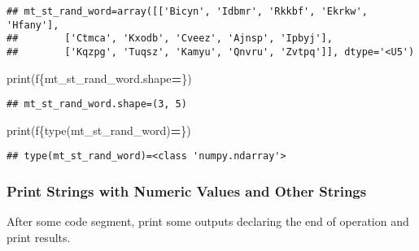\documentclass[
]{book}
\newenvironment{Shaded}{\begin{snugshade}}{\end{snugshade}}
\newcommand{\BuiltInTok}[1]{#1}
\newcommand{\NormalTok}[1]{#1}
\newcommand{\OperatorTok}[1]{\textcolor[rgb]{0.81,0.36,0.00}{\textbf{#1}}}
\newcommand{\SpecialCharTok}[1]{\textcolor[rgb]{0.00,0.00,0.00}{#1}}
\newcommand{\SpecialStringTok}[1]{\textcolor[rgb]{0.31,0.60,0.02}{#1}}
\begin{document}
\begin{verbatim}
## mt_st_rand_word=array([['Bicyn', 'Idbmr', 'Rkkbf', 'Ekrkw', 'Hfany'],
##        ['Ctmca', 'Kxodb', 'Cveez', 'Ajnsp', 'Ipbyj'],
##        ['Kqzpg', 'Tuqsz', 'Kamyu', 'Qnvru', 'Zvtpq']], dtype='<U5')
\end{verbatim}

\begin{Shaded}
\begin{Highlighting}[]
\BuiltInTok{print}\NormalTok{(}\SpecialStringTok{f\textquotesingle{}}\SpecialCharTok{\{}\NormalTok{mt\_st\_rand\_word}\SpecialCharTok{.}\NormalTok{shape}\OperatorTok{=}\SpecialCharTok{\}}\SpecialStringTok{\textquotesingle{}}\NormalTok{)}
\end{Highlighting}
\end{Shaded}

\begin{verbatim}
## mt_st_rand_word.shape=(3, 5)
\end{verbatim}

\begin{Shaded}
\begin{Highlighting}[]
\BuiltInTok{print}\NormalTok{(}\SpecialStringTok{f\textquotesingle{}}\SpecialCharTok{\{}\BuiltInTok{type}\NormalTok{(mt\_st\_rand\_word)}\OperatorTok{=}\SpecialCharTok{\}}\SpecialStringTok{\textquotesingle{}}\NormalTok{)}
\end{Highlighting}
\end{Shaded}

\begin{verbatim}
## type(mt_st_rand_word)=<class 'numpy.ndarray'>
\end{verbatim}

\hypertarget{print-strings-with-numeric-values-and-other-strings}{%
\subsubsection{Print Strings with Numeric Values and Other Strings}\label{print-strings-with-numeric-values-and-other-strings}}

After some code segment, print some outputs declaring the end of operation and print results.
\end{document}
